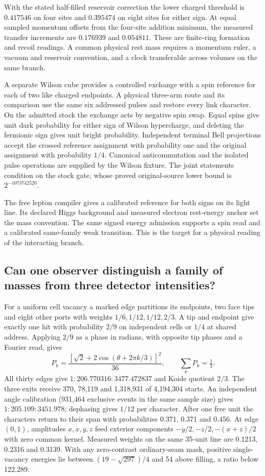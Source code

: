 With the stated half-filled reservoir correction the lower charged
threshold is \(0.417546\) on four sites and \(0.395474\) on eight sites
for either sign. At equal sampled momentum offsets from the four-site
addition minimum, the measured transfer increments are \(0.176939\)
and \(0.054811\). These are finite-ring formation and recoil readings.
A common physical rest mass requires a momentum ruler, a vacuum and
reservoir convention, and a clock transferable across volumes on
the same branch.

A separate Wilson cube provides a controlled exchange with a spin
reference for each of two like charged endpoints. A physical
three-arm route and its comparison use the same six addressed pulses
and restore every link character. On the admitted stock the
exchange acts by negative spin swap. Equal spins give unit dark
probability for either sign of Wilson hypercharge, and deleting the
fermionic sign gives unit bright probability. Independent terminal
Bell projections accept the crossed reference assignment with
probability one and the original assignment with probability \(1/4\).
Canonical anticommutation and the isolated pulse operations are
supplied by the Wilson fixture. The joint statements condition on
the stock gate, whose proved original-source lower bound is
\(2^{-1073742520}\).

The free lepton compiler gives a calibrated reference for both signs
on its light line. Its declared Higgs background and measured electron
rest-energy anchor set the mass convention. The same signed energy
admission supports a spin read and a calibrated same-family weak
transition. This is the target for a physical reading of the
interacting branch.

\subsection{Can one observer distinguish a family of masses from three detector intensities?}
\label{sec:charged-register-release}

For a uniform cell vacancy a marked edge partitions its endpoints,
two face tips and eight other ports with weights $1/6,1/12,1/12,2/3$.
A tip and endpoint give exactly one hit with probability $2/9$ on
independent cells or $1/4$ at shared address. Applying $2/9$ as a
phase in radians, with opposite tip phases and a Fourier read, gives
\[
 P_k=\frac{[\sqrt{2}+2\cos(\theta+2\pi k/3)]^2}{36},
 \qquad \sum_k P_k=\tfrac13 .
\]
All thirty edges give $1:206.770316:3477.472837$ and Koide quotient
$2/3$. The three exits receive 370, 78,119 and 1,318,931 of 4,194,304
starts. An independent angle calibration (931,464 exclusive events in
the same sample size) gives $1:205.109:3451.978$; dephasing gives
$1/12$ per character. After one free unit the characters return to
their span with probabilities 0.371, 0.371 and 0.456. At edge $(0,1)$,
amplitudes $x,x,y,z$ feed exterior components $-y/2,-z/2,-(x+z)/2$
with zero common kernel. Measured weights on the same 35-unit line
are 0.1213, 0.2316 and 0.3139. With any zero-contrast ordinary-seam
mask, positive single-vacancy energies lie between
$(19-\sqrt{297})/4$ and 54 above filling, a ratio below 122.289.

